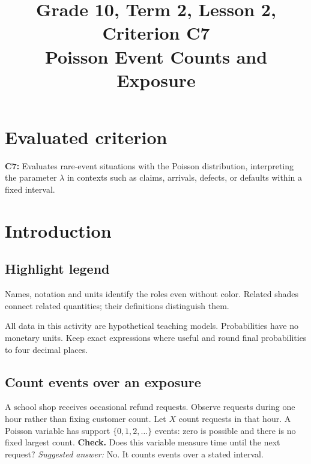 \makeatletter
{}
\makeatother



\CoordinatedTermTwoPalette
\usepackage{needspace}
\setlength{\emergencystretch}{2em}
\title{Grade 10, Term 2, Lesson 2, Criterion C7\\Poisson Event Counts and Exposure}
\author{}
\date{}

\maketitle
\setcounter{tocdepth}{1}
\setcounter{secnumdepth}{2}
\label{toc}
\tableofcontents
\section*{Evaluated criterion}
\textbf{C7:} Evaluates rare-event situations with the Poisson distribution, interpreting the parameter $\lambda$ in contexts such as claims, arrivals, defects, or defaults within a fixed interval.
\section{Introduction}\label{sec:t2-c7-introduction}
\subsection*{Highlight legend}
\label{tab:highlight-legend}
Names, notation and units identify the roles even without color. Related shades connect related quantities; their definitions distinguish them.

All data in this activity are hypothetical teaching models. Probabilities have no monetary units. Keep exact expressions where useful and round final probabilities to four decimal places.
\subsection{Count events over an exposure}
A school shop receives occasional refund requests. Observe requests during one hour rather than fixing customer count. Let $X$ count requests in that hour. A Poisson variable has support $\{0,1,2,\ldots\}$ events: zero is possible and there is no fixed largest count.
\textbf{Check.} Does this variable measure time until the next request? \emph{Suggested answer:} No. It counts events over a stated interval.


